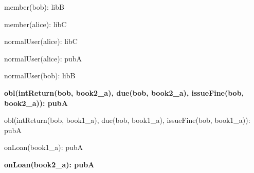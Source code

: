 \documentclass{article}
\begin{document}
{\begin{minipage}{\tableWidth}
\begin{description}[align=left,leftmargin=1em,noitemsep,labelsep=\parindent]
\item{{member(\allowbreak{}bob): libB}}
\item{{member(\allowbreak{}alice): libC}}
\item{{normalUser(\allowbreak{}alice): libC}}
\item{{normalUser(\allowbreak{}alice): pubA}}
\item{{normalUser(\allowbreak{}bob): libB}}
\item\textbf{{obl(\allowbreak{}intReturn(\allowbreak{}bob, book2\_a), due(\allowbreak{}bob, book2\_a), issueFine(\allowbreak{}bob, book2\_a)): pubA}}
\item{{obl(\allowbreak{}intReturn(\allowbreak{}bob, book1\_a), due(\allowbreak{}bob, book1\_a), issueFine(\allowbreak{}bob, book1\_a)): pubA}}
\item{{onLoan(\allowbreak{}book1\_a): pubA}}
\item\textbf{{onLoan(\allowbreak{}book2\_a): pubA}}
\end{description}\end{minipage}}
\end{document}
